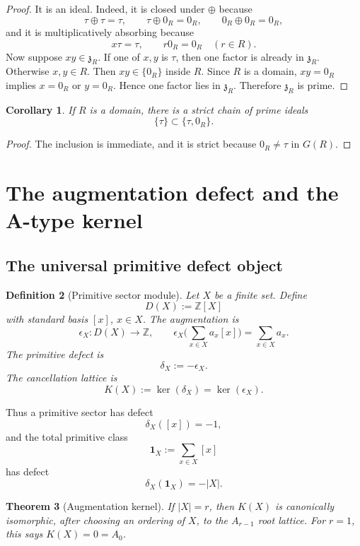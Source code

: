 \documentclass[11pt]{amsart}
\newtheorem{theorem}{Theorem}[section]
\newtheorem{corollary}[theorem]{Corollary}
\newtheorem{definition}[theorem]{Definition}
\newcommand{\ZZ}{\mathbb Z}
\newcommand{\tauz}{\tau}
\newcommand{\one}{\mathbf 1}
\begin{document}
\begin{proof}
It is an ideal.  Indeed, it is closed under $\oplus$ because
\[
     \tauz\oplus\tauz=\tauz,
     \qquad
     \tauz\oplus 0_R=0_R,
     \qquad
     0_R\oplus0_R=0_R,
\]
and it is multiplicatively absorbing because
\[
     x\tauz=\tauz,
     \qquad
     r0_R=0_R\quad(r\in R).
\]
Now suppose $xy\in\mathfrak z_R$.  If one of $x,y$ is $\tauz$, then one factor is already in $\mathfrak z_R$.  Otherwise $x,y\in R$.  Then $xy\in\{0_R\}$ inside $R$.  Since $R$ is a domain, $xy=0_R$ implies $x=0_R$ or $y=0_R$.  Hence one factor lies in $\mathfrak z_R$.  Therefore $\mathfrak z_R$ is prime.\end{proof}

\begin{corollary}
If $R$ is a domain, there is a strict chain of prime ideals
\[
        \{\tauz\}\subset \{\tauz,0_R\}.
\]
\end{corollary}

\begin{proof}
The inclusion is immediate, and it is strict because $0_R\ne\tauz$ in $G(R)$.\end{proof}

\section{The augmentation defect and the A-type kernel}

\subsection{The universal primitive defect object}

\begin{definition}[Primitive sector module]
Let $X$ be a finite set.  Define
\[
       D(X):=\ZZ[X]
\]
with standard basis $[x]$, $x\in X$.  The augmentation is
\[
       \epsilon_X:D(X)\to\ZZ,
       \qquad
       \epsilon_X\Big(\sum_{x\in X}a_x[x]\Big)=\sum_{x\in X}a_x.
\]
The primitive defect is
\[
       \delta_X:=-\epsilon_X.
\]
The cancellation lattice is
\[
       K(X):=\ker(\delta_X)=\ker(\epsilon_X).
\]
\end{definition}

Thus a primitive sector has defect
\[
       \delta_X([x])=-1,
\]
and the total primitive class
\[
       \one_X:=\sum_{x\in X}[x]
\]
has defect
\[
       \delta_X(\one_X)=-|X|.
\]

\begin{theorem}[Augmentation kernel]
If $|X|=r$, then $K(X)$ is canonically isomorphic, after choosing an ordering of $X$, to the $A_{r-1}$ root lattice.  For $r=1$, this says $K(X)=0=A_0$.
\end{theorem}
\end{document}
